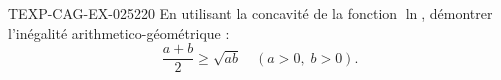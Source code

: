 \begin{exercice}{TEXP-CAG-EX-025}{2}{20}
En utilisant la concavité de la fonction $\ln$, démontrer l'inégalité arithmetico-géométrique :
\[ \frac{a+b}{2} \geq \sqrt{ab} \quad (a > 0,\; b > 0). \]

\end{exercice}
